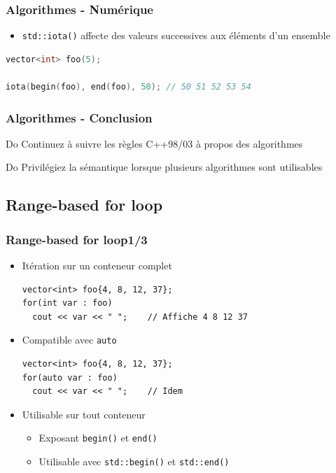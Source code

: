 \documentclass[C++.tex]{subfiles}
\begin{document}
\begin{frame}[fragile]
	\frametitle{Algorithmes - Numérique}
	\begin{itemize}
		\item \lstinline|std::iota()| affecte des valeurs successives aux éléments d'un ensemble
	\end{itemize}

	\begin{lstlisting}[language=C++]
vector<int> foo(5);

iota(begin(foo), end(foo), 50); // 50 51 52 53 54\end{lstlisting}
\end{frame}

\begin{frame}[fragile]
	\frametitle{Algorithmes - Conclusion}
	\begin{exampleblock}{Do}
		Continuez à suivre les règles C++98/03 à propos des algorithmes
	\end{exampleblock}

	\begin{exampleblock}{Do}
		Privilégiez la sémantique lorsque plusieurs algorithmes sont utilisables
	\end{exampleblock}
\end{frame}

\subsection*{Range-based for loop}
\begin{frame}[fragile]
	\frametitle{Range-based for loop\titlehfill{}1/3}
	\begin{itemize}
		\item Itération sur un \og conteneur\fg{} complet

	\begin{lstlisting}
vector<int> foo{4, 8, 12, 37};
for(int var : foo)
  cout << var << " ";    // Affiche 4 8 12 37\end{lstlisting}

		\item Compatible avec \lstinline|auto|

	\begin{lstlisting}
vector<int> foo{4, 8, 12, 37};
for(auto var : foo)
  cout << var << " ";    // Idem\end{lstlisting}

		\item Utilisable sur tout conteneur
		\begin{itemize}
			\item Exposant \lstinline|begin()| et \lstinline|end()|
			\item Utilisable avec \lstinline|std::begin()| et \lstinline|std::end()|
		\end{itemize}
	\end{itemize}
\end{frame}
\end{document}
